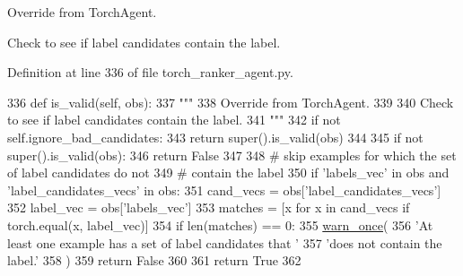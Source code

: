 \begin{DoxyVerb}Override from TorchAgent.

Check to see if label candidates contain the label.
\end{DoxyVerb}
 

Definition at line 336 of file torch\+\_\+ranker\+\_\+agent.\+py.


\begin{DoxyCode}
336     \textcolor{keyword}{def }is\_valid(self, obs):
337         \textcolor{stringliteral}{"""}
338 \textcolor{stringliteral}{        Override from TorchAgent.}
339 \textcolor{stringliteral}{}
340 \textcolor{stringliteral}{        Check to see if label candidates contain the label.}
341 \textcolor{stringliteral}{        """}
342         \textcolor{keywordflow}{if} \textcolor{keywordflow}{not} self.ignore\_bad\_candidates:
343             \textcolor{keywordflow}{return} super().is\_valid(obs)
344 
345         \textcolor{keywordflow}{if} \textcolor{keywordflow}{not} super().is\_valid(obs):
346             \textcolor{keywordflow}{return} \textcolor{keyword}{False}
347 
348         \textcolor{comment}{# skip examples for which the set of label candidates do not}
349         \textcolor{comment}{# contain the label}
350         \textcolor{keywordflow}{if} \textcolor{stringliteral}{'labels\_vec'} \textcolor{keywordflow}{in} obs \textcolor{keywordflow}{and} \textcolor{stringliteral}{'label\_candidates\_vecs'} \textcolor{keywordflow}{in} obs:
351             cand\_vecs = obs[\textcolor{stringliteral}{'label\_candidates\_vecs'}]
352             label\_vec = obs[\textcolor{stringliteral}{'labels\_vec'}]
353             matches = [x \textcolor{keywordflow}{for} x \textcolor{keywordflow}{in} cand\_vecs \textcolor{keywordflow}{if} torch.equal(x, label\_vec)]
354             \textcolor{keywordflow}{if} len(matches) == 0:
355                 \hyperlink{namespaceparlai_1_1utils_1_1misc_acf146e70ea7f6867969a7c2b545d4b4b}{warn\_once}(
356                     \textcolor{stringliteral}{'At least one example has a set of label candidates that '}
357                     \textcolor{stringliteral}{'does not contain the label.'}
358                 )
359                 \textcolor{keywordflow}{return} \textcolor{keyword}{False}
360 
361         \textcolor{keywordflow}{return} \textcolor{keyword}{True}
362 
\end{DoxyCode}
\mbox{\label{classparlai_1_1core_1_1torch__ranker__agent_1_1TorchRankerAgent_a353991d201d8889c453bf72c15ec78a9}} 
